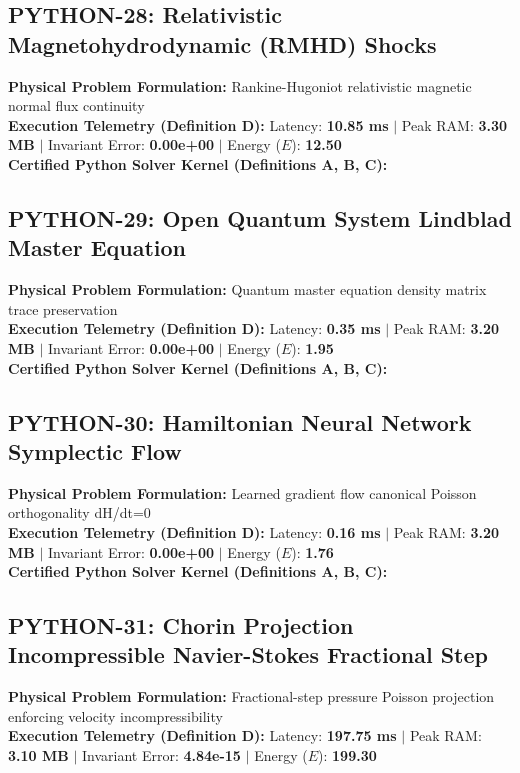 \vspace{1em}
\subsection{PYTHON-28: Relativistic Magnetohydrodynamic (RMHD) Shocks}
\textbf{Physical Problem Formulation:} Rankine-Hugoniot relativistic magnetic normal flux continuity\\
\textbf{Execution Telemetry (Definition D):} Latency: \textbf{10.85 ms} $|$ Peak RAM: \textbf{3.30 MB} $|$ Invariant Error: \textbf{0.00e+00} $|$ Energy ($E$): \textbf{12.50}\\

\textbf{Certified Python Solver Kernel (Definitions A, B, C):}


\vspace{1em}
\subsection{PYTHON-29: Open Quantum System Lindblad Master Equation}
\textbf{Physical Problem Formulation:} Quantum master equation density matrix trace preservation\\
\textbf{Execution Telemetry (Definition D):} Latency: \textbf{0.35 ms} $|$ Peak RAM: \textbf{3.20 MB} $|$ Invariant Error: \textbf{0.00e+00} $|$ Energy ($E$): \textbf{1.95}\\

\textbf{Certified Python Solver Kernel (Definitions A, B, C):}


\vspace{1em}
\subsection{PYTHON-30: Hamiltonian Neural Network Symplectic Flow}
\textbf{Physical Problem Formulation:} Learned gradient flow canonical Poisson orthogonality dH/dt=0\\
\textbf{Execution Telemetry (Definition D):} Latency: \textbf{0.16 ms} $|$ Peak RAM: \textbf{3.20 MB} $|$ Invariant Error: \textbf{0.00e+00} $|$ Energy ($E$): \textbf{1.76}\\

\textbf{Certified Python Solver Kernel (Definitions A, B, C):}


\vspace{1em}
\subsection{PYTHON-31: Chorin Projection Incompressible Navier-Stokes Fractional Step}
\textbf{Physical Problem Formulation:} Fractional-step pressure Poisson projection enforcing velocity incompressibility\\
\textbf{Execution Telemetry (Definition D):} Latency: \textbf{197.75 ms} $|$ Peak RAM: \textbf{3.10 MB} $|$ Invariant Error: \textbf{4.84e-15} $|$ Energy ($E$): \textbf{199.30}\\

